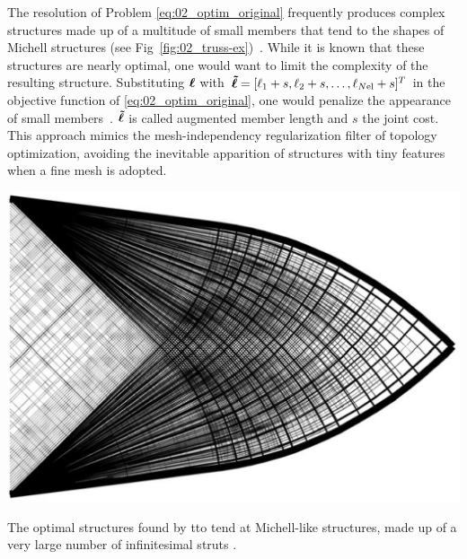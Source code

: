 The resolution of Problem \ref{eq:02_optim_original} frequently produces complex structures made up of a multitude of small members that tend to the shapes of Michell structures (see Fig~\ref{fig:02_truss-ex})~. While it is known that these structures are nearly optimal, one would want to limit the complexity of the resulting structure. Substituting $\bm{\ell}$ with $\bm{\tilde{\ell}} = [\ell_1 + s, \ell_2 + s, \ldots,\ell_{N\text{el}} + s]^T$ in the objective function of \ref{eq:02_optim_original}, one would penalize the appearance of small members~. $\bm{\tilde{\ell}}$ is called augmented member length and $s$ the joint cost. This approach mimics the mesh-independency regularization filter of topology optimization, avoiding the inevitable apparition of structures with tiny features when a fine mesh is adopted.

\begin{marginfigure}
    \centering
    \includegraphics[width=\linewidth]{figures/02_literature/truss-ex.png}
    \caption{The optimal structures found by \gls{tto} tend at Michell-like structures, made up of a very large number of infinitesimal struts \cite{gilbert_layout_2003}.}
    \label{fig:02_truss-ex}
\end{marginfigure}

